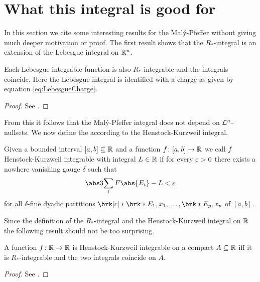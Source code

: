 \section{What this integral is good for}

In this section we cite some interesting results for the Malý-Pfeffer without giving much deeper motivation or proof. The first result shows that the $R_*$-integral is an extension of the Lebesgue integral on $\mathbb{R}^n$.

\begin{proposition}
Each Lebesgue-integrable function is also $R_*$-integrable and the integrals coincide. Here the Lebesgue integral is identified with a charge as given by equation \ref{eq:LebesgueCharge}.
\end{proposition}
\begin{proof}
See \cite[Proposition 3.5]{Pfe2016}.
\end{proof}

\noindent
From this it follows that the Malý-Pfeffer integral does not depend on $\mathcal{L}^n$-nullsets. We now define the according to \cite[Appendix H]{Coh2013} the Henstock-Kurzweil integral.

\begin{definition}
Given a bounded  interval $[a,b]\subseteq\mathbb{R}$ and a function $f\colon[a,b]\to\mathbb{R}$ we call $f$ Henstock-Kurzweil integrable with integral $L\in\mathbb{R}$ if for every $\varepsilon>0$ there exists a nowhere vanishing gauge $\delta$ such that
\begin{align*}
	\abs3{\sum_iF\abs{E_i}-L}<\e
\end{align*}
for all $\delta$-fine dyadic partitions $\brk[c]*{\brk*{E_1,x_1},\dots,\brk*{E_p,x_p}}$ of $[a,b]$.
\end{definition}

Since the definition of the $R_*$-integral and the Henstock-Kurzweil integral on $\mathbb{R}$ the following result should not be too surprising. 

\begin{proposition}
A function $f\colon\mathbb{R}\to\mathbb{R}$ is Henstock-Kurzweil integrable on a compact $A\subseteq\mathbb{R}$ iff it is $R_*$-integrable and the two integrals coincide on $A$.
\end{proposition}
\begin{proof}
See \cite[Proposition 3.6]{Pfe2016}.
\end{proof}

